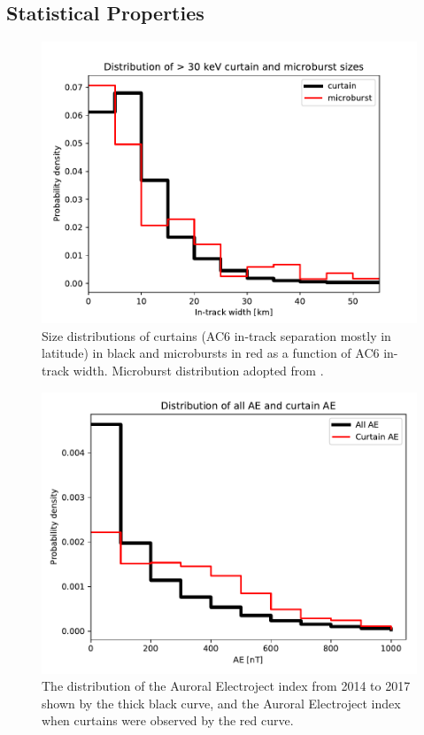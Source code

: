 \documentclass[draft]{agujournal2019}
\begin{document}
\subsection{Statistical Properties}

\begin{figure}
\includegraphics[width=\textwidth]{ac6_curtain_microburst_width_dist.pdf}
\caption{Size distributions of curtains (AC6 in-track separation mostly in latitude) in black and microbursts in red as a function of AC6 in-track width. Microburst distribution adopted from .}
\label{ae_width_dist}
\end{figure}

\begin{figure}
\includegraphics[width=\textwidth]{ac6_curtain_AE_dist.pdf}
\caption{The distribution of the Auroral Electroject index from 2014 to 2017 shown by the thick black curve, and the Auroral Electroject index when curtains were observed by the red curve.}
\label{ae_width_dist}
\end{figure}
\end{document}
